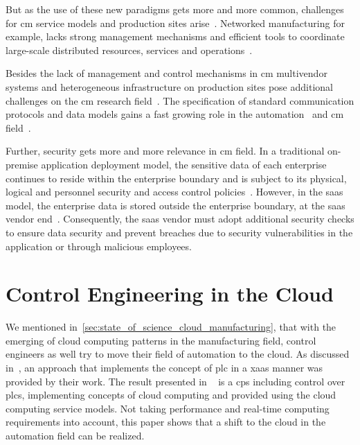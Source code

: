 \documentclass[
a4paper,
twoside,
headsepline,
cleardoublepage=empty,
parskip=half,
draft=false
]{scrbook}
\begin{document}
			But as the use of these new paradigms gets more and more common, challenges for \gls{cm} service models and production sites arise~\cite{brettel2014virtualization}.
			Networked manufacturing for example, lacks strong management mechanisms and efficient tools to coordinate large-scale distributed resources, services and operations~\cite{xu2012cloud}.
			
			Besides the lack of management and control mechanisms in \gls{cm} multivendor systems and heterogeneous infrastructure on production sites pose additional challenges on the \gls{cm} research field~\cite{weyer2015towards}.
			The specification of standard communication protocols and data models gains a fast growing role in the automation~\cite{jazdi2014cyber} and \gls{cm} field~\cite{wollschlaeger2017future}.
			
			Further, security gets more and more relevance in \gls{cm} field.
			In a traditional on-premise application deployment model, the sensitive data of each enterprise continues to reside within the enterprise boundary and is subject to its physical, logical and personnel security and access control policies~\cite{jeschke2017industrial}. 
			However, in the \gls{saas} model, the enterprise data is stored outside the enterprise boundary, at the \gls{saas} vendor end~\cite{subashini2011survey}.
			Consequently, the \gls{saas} vendor must adopt additional security checks to ensure data security and prevent breaches due to security vulnerabilities in the application or through malicious employees.

		\section{Control Engineering in the Cloud}\label{sec:control_engineering_in_the_cloud}

			We mentioned in~\cref{sec:state_of_science_cloud_manufacturing}, that with the emerging of cloud computing patterns in the manufacturing field, control engineers as well try to move their field of automation to the cloud.
			As discussed in~\cite{jazdi2014cyber}, an approach that implements the concept of \gls{plc} in a \gls{xaas} manner was provided by their work. 
			The result presented in ~\cite{jazdi2014cyber} is a \gls{cps} including control over \gls{plc}s, implementing concepts of cloud computing and provided using the cloud computing service models. 
			Not taking performance and real-time computing requirements into account, this paper shows that a shift to the cloud in the automation field can be realized.
			
\end{document}
